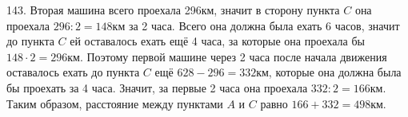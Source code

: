 143. Вторая машина всего проехала 296км, значит в сторону пункта $C$ она проехала $296:2=148$км за 2 часа. Всего она должна была ехать 6 часов, значит до пункта $C$ ей оставалось ехать ещё 4 часа, за которые она проехала бы $148\cdot2=296$км. Поэтому первой машине через 2 часа после начала движения оставалось ехать до пункта $C$ ещё $628-296=332$км, которые она должна была бы проехать за 4 часа. Значит, за первые 2 часа она проехала $332:2=166$км. Таким образом, расстояние между пунктами $A$ и $C$ равно $166+332=498$км.\\
